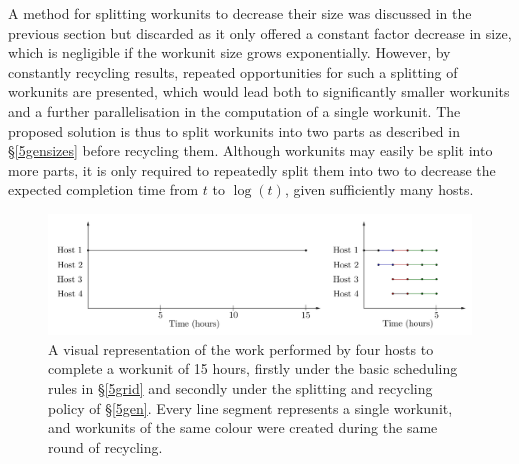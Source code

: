 A method for splitting workunits to decrease their size was discussed in the previous section but discarded as it only offered  a constant factor decrease in size, which is negligible if the workunit size grows exponentially. 
However, by constantly recycling results, repeated opportunities for such  a  splitting of workunits are presented, which would lead both to significantly smaller workunits and a further parallelisation in the computation of a single workunit. 
The proposed solution is thus to split workunits into two parts as described in \S\ref{5gensizes} before recycling them. Although workunits may easily be split into more parts, it is only required to repeatedly split them into two to decrease the expected completion time from $t$ to $\log(t)$, given sufficiently many hosts.
\begin{figure}[b]
\centering
\includegraphics[width=15.5cm]{images/splits}
\caption{A visual representation of the work performed by four hosts to complete a workunit of 15 hours, firstly under the basic scheduling rules in \S\ref{5grid} and secondly under the splitting and recycling policy of \S\ref{5gen}. Every line segment represents a single workunit, and workunits of the same colour were created during the same round of recycling.} \label{fig:splits}
\end{figure}

